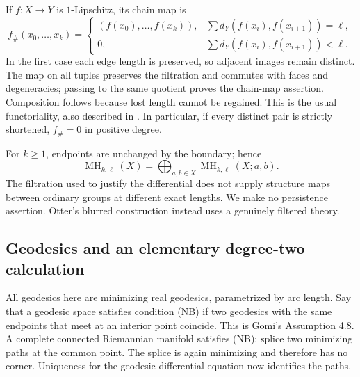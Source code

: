 \documentclass[12pt]{amsart}
\theoremstyle{definition}
\theoremstyle{remark}
\numberwithin{equation}{section}
\DeclareMathOperator{\MH}{MH}
\begin{document}
If $f:X\to Y$ is $1$-Lipschitz, its chain map is
\begin{equation}\label{eq:functor}
 f_\#(x_0,\ldots,x_k)=
 \begin{cases}(f(x_0),\ldots,f(x_k)),&\sum d_Y(f(x_i),f(x_{i+1}))=\ell,\\
 0,&\sum d_Y(f(x_i),f(x_{i+1}))<\ell.
 \end{cases}
\end{equation}
In the first case each edge length is preserved, so adjacent images remain distinct. The map on all tuples preserves the filtration and commutes with faces and degeneracies; passing to the same quotient proves the chain-map assertion. Composition follows because lost length cannot be regained. This is the usual functoriality, also described in \cite[Definition 2.1]{Hepworth}. In particular, if every distinct pair is strictly shortened, $f_\#=0$ in positive degree.

For $k\ge1$, endpoints are unchanged by the boundary; hence
\begin{equation}\label{eq:endpoint-sum}
 \MH_{k,\ell}(X)=\bigoplus_{a,b\in X}\MH_{k,\ell}(X;a,b).
\end{equation}
The filtration used to justify the differential does not supply structure maps between ordinary groups at different exact lengths. We make no persistence assertion. Otter's blurred construction \cite[Definition 28, Theorem 29]{Otter} instead uses a genuinely filtered theory.

\subsection{Geodesics and an elementary degree-two calculation}
All geodesics here are minimizing real geodesics, parametrized by arc length. Say that a geodesic space satisfies condition (NB) if two geodesics with the same endpoints that meet at an interior point coincide. This is Gomi's Assumption 4.8. A complete connected Riemannian manifold satisfies (NB): splice two minimizing paths at the common point. The splice is again minimizing and therefore has no corner. Uniqueness for the geodesic differential equation now identifies the paths.
\end{document}

